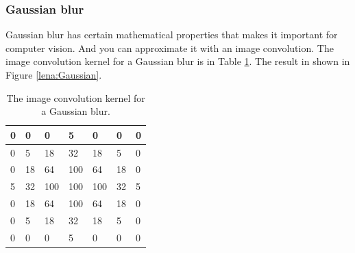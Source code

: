 \subsubsection{Gaussian blur}
Gaussian blur has certain mathematical properties that makes it important for computer vision. And you can approximate it with an image convolution. The image convolution kernel for a Gaussian blur is in Table \ref{Gaussianblur}. The result in shown in Figure \ref{lena:Gaussian}.
\begin{table}[!ht]
	\centering
	\begin{tabular}{|l|l|l|l|l|l|l|}
		\hline
		0 & 0  & 0   & 5   & 0   & 0  & 0 \\ \hline
		0 & 5  & 18  & 32  & 18  & 5  & 0 \\ \hline
		0 & 18 & 64  & 100 & 64  & 18 & 0 \\ \hline
		5 & 32 & 100 & 100 & 100 & 32 & 5 \\ \hline
		0 & 18 & 64  & 100 & 64  & 18 & 0 \\ \hline
		0 & 5  & 18  & 32  & 18  & 5  & 0 \\ \hline
		0 & 0  & 0   & 5   & 0   & 0  & 0 \\ \hline
	\end{tabular}
	\caption{The image convolution kernel for a Gaussian blur.}
	\label{Gaussianblur}
\end{table}
\begin{figure}[H]
	\centering
\end{figure}

